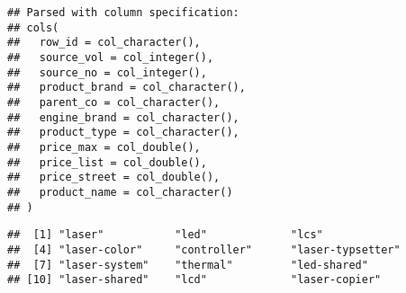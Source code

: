 \documentclass[]{article}
\newenvironment{Shaded}{\begin{snugshade}}{\end{snugshade}}
\newcommand{\CommentTok}[1]{\textcolor[rgb]{0.56,0.35,0.01}{\textit{#1}}}
\newcommand{\KeywordTok}[1]{\textcolor[rgb]{0.13,0.29,0.53}{\textbf{#1}}}
\newcommand{\NormalTok}[1]{#1}
\newcommand{\OperatorTok}[1]{\textcolor[rgb]{0.81,0.36,0.00}{\textbf{#1}}}
\begin{document}
\begin{verbatim}
## Parsed with column specification:
## cols(
##   row_id = col_character(),
##   source_vol = col_integer(),
##   source_no = col_integer(),
##   product_brand = col_character(),
##   parent_co = col_character(),
##   engine_brand = col_character(),
##   product_type = col_character(),
##   price_max = col_double(),
##   price_list = col_double(),
##   price_street = col_double(),
##   product_name = col_character()
## )
\end{verbatim}

\begin{Shaded}
\end{Shaded}

\begin{verbatim}
##  [1] "laser"           "led"             "lcs"            
##  [4] "laser-color"     "controller"      "laser-typsetter"
##  [7] "laser-system"    "thermal"         "led-shared"     
## [10] "laser-shared"    "lcd"             "laser-copier"
\end{verbatim}
\end{document}
